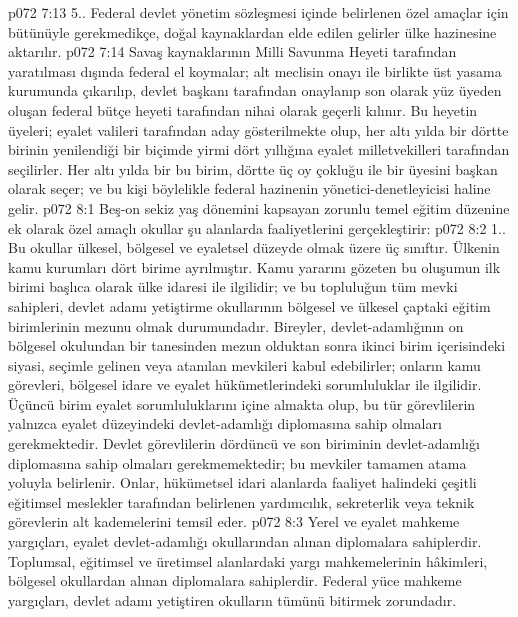\vs p072 7:13 5.\bibnobreakspace {}. Federal devlet yönetim sözleşmesi içinde belirlenen özel amaçlar için bütünüyle gerekmedikçe, doğal kaynaklardan elde edilen gelirler ülke hazinesine aktarılır.
\vs p072 7:14 Savaş kaynaklarının Milli Savunma Heyeti tarafından yaratılması dışında federal el koymalar; alt meclisin onayı ile birlikte üst yasama kurumunda çıkarılıp, devlet başkanı tarafından onaylanıp son olarak yüz üyeden oluşan federal bütçe heyeti tarafından nihai olarak geçerli kılınır. Bu heyetin üyeleri; eyalet valileri tarafından aday gösterilmekte olup, her altı yılda bir dörtte birinin yenilendiği bir biçimde yirmi dört yıllığına eyalet milletvekilleri tarafından seçilirler. Her altı yılda bir bu birim, dörtte üç oy çokluğu ile bir üyesini başkan olarak seçer; ve bu kişi böylelikle federal hazinenin yönetici\hyp{}denetleyicisi haline gelir.
\vs p072 8:1 Beş\hyp{}on sekiz yaş dönemini kapsayan zorunlu temel eğitim düzenine ek olarak özel amaçlı okullar şu alanlarda faaliyetlerini gerçekleştirir:
\vs p072 8:2 1.\bibnobreakspace {}. Bu okullar ülkesel, bölgesel ve eyaletsel düzeyde olmak üzere üç sınıftır. Ülkenin kamu kurumları dört birime ayrılmıştır. Kamu yararını gözeten bu oluşumun ilk birimi başlıca olarak ülke idaresi ile ilgilidir; ve bu topluluğun tüm mevki sahipleri, devlet adamı yetiştirme okullarının bölgesel ve ülkesel çaptaki eğitim birimlerinin mezunu olmak durumundadır. Bireyler, devlet\hyp{}adamlığının on bölgesel okulundan bir tanesinden mezun olduktan sonra ikinci birim içerisindeki siyasi, seçimle gelinen veya atanılan mevkileri kabul edebilirler; onların kamu görevleri, bölgesel idare ve eyalet hükümetlerindeki sorumluluklar ile ilgilidir. Üçüncü birim eyalet sorumluluklarını içine almakta olup, bu tür görevlilerin yalnızca eyalet düzeyindeki devlet\hyp{}adamlığı diplomasına sahip olmaları gerekmektedir. Devlet görevlilerin dördüncü ve son biriminin devlet\hyp{}adamlığı diplomasına sahip olmaları gerekmemektedir; bu mevkiler tamamen atama yoluyla belirlenir. Onlar, hükümetsel idari alanlarda faaliyet halindeki çeşitli eğitimsel meslekler tarafından belirlenen yardımcılık, sekreterlik veya teknik görevlerin alt kademelerini temsil eder.
\vs p072 8:3 Yerel ve eyalet mahkeme yargıçları, eyalet devlet\hyp{}adamlığı okullarından alınan diplomalara sahiplerdir. Toplumsal, eğitimsel ve üretimsel alanlardaki yargı mahkemelerinin hâkimleri, bölgesel okullardan alınan diplomalara sahiplerdir. Federal yüce mahkeme yargıçları, devlet adamı yetiştiren okulların tümünü bitirmek zorundadır.
